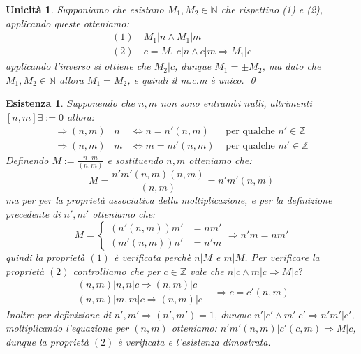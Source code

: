 \documentclass{article}
\makeatletter
\renewenvironment{proof}[1][\proofname]{\par
    \pushQED{\qed}%
    \normalfont \topsep6\p@\@plus6\p@\relax
    \trivlist
    \item\relax
    {\itshape
    #1\@addpunct{.}}\hspace\labelsep\ignorespaces
    }{%
    \popQED\endtrivlist\@endpefalse
}
\newtheorem*{existence}{Esistenza}
\newtheorem*{uniqueness}{Unicità}
\makeatother
\begin{document}
    \begin{proof}
        \begin{uniqueness}
            Supponiamo che esistano \(M_1,M_2\in\mathbb{N}\) che rispettino (1) e (2), applicando queste otteniamo:
            \[
                \begin{aligned}
                    (1)&\ M_1|n \land M_1|m\\
                    (2)&\ c=M_1\ c|n \land c|m \Rightarrow M_1|c
                \end{aligned}
            \]
            applicando l'inverso si ottiene che \(M_2|c\), dunque \(M_1=\pm M_2\), ma dato che \(M_1,M_2\in\mathbb{N}\) allora \(M_1=M_2\), e quindi il m.c.m è unico.
            \qed
        \end{uniqueness}
        \begin{existence}
            Supponendo che \(n,m\) non sono entrambi nulli, altrimenti \([n,m]\exists :=0\) allora:
            \[
                \begin{aligned}
                    \Rightarrow (n,m)\mid n&\Leftrightarrow n=n'(n,m)&\text{ per qualche } n' \in\mathbb{Z}\\
                    \Rightarrow (n,m)\mid m&\Leftrightarrow m=m'(n,m)&\text{ per qualche } m' \in\mathbb{Z}
                \end{aligned}
            \]
            Definendo \(M:=\frac{n\cdot m}{(n,m)}\) e sostituendo \(n,m\) otteniamo che:
            \[
                M=\frac{n'm'(n,m)(n,m)}{(n,m)}=n'm'(n,m)
            \]
            ma per per la proprietà associativa della moltiplicazione, e per la definizione precedente di \(n',m'\) otteniamo che: 
            \[
                M=\begin {cases}
                    (n'(n,m))m'&=nm'\\
                    (m'(n,m))n'&=n'm
                \end{cases}\Rightarrow n'm = nm'
            \]
            quindi la proprietà \((1)\) è verificata perchè \(n|M\) e \(m|M\).
            Per verificare la proprietà \((2)\) controlliamo che per \(c\in\mathbb{Z}\) vale che \(n|c\land m|c\Rightarrow M|c?\)
            \[
                \begin{aligned}
                (n,m)|n,n|c\Rightarrow (n,m)|c&\\
                (n,m)|m,m|c\Rightarrow (n,m)|c&
                \end{aligned}\Rightarrow c=c'(n,m)
            \]
            Inoltre per definizione di \(n',m'\Rightarrow(n',m')=1\), dunque \(n'|c'\land m'|c'\Rightarrow n'm'|c'\), moltiplicando l'equazione per \((n,m)\) otteniamo: \(n'm'(n,m)|c'(c,m)\Rightarrow M|c\), dunque la proprietà \((2)\) è verificata e l'esistenza dimostrata.
        \end{existence}
        \raggedleft{\pushQED{\ensuremath{\blacksquare}}}
    \end{proof}
\pagebreak
\end{document}
